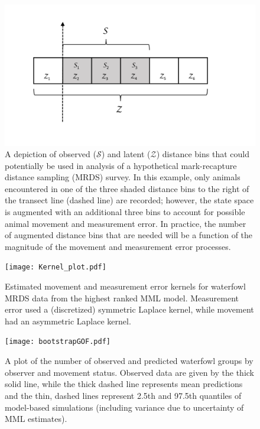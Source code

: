 \documentclass[12pt,fleqn]{article}
\begin{document}
\pagebreak
\begin{figure}
\begin{center}
\includegraphics[width=150mm]{augmented_bin_figure.pdf}
\caption{A depiction of observed ($\mathcal{S}$) and latent ($\mathcal{Z}$) distance bins that could potentially be used in analysis of a hypothetical mark-recapture distance sampling (MRDS) survey.  In this example, only animals encountered in one of the three shaded distance bins to the right of the transect line (dashed line) are recorded; however, the state space is augmented with an additional three bins to account for possible animal movement and measurement error.  In practice, the number of augmented distance bins that are needed will be a function of the magnitude of the movement and measurement error processes.}
\label{fig:aug_bins}
\end{center}
\end{figure}


\pagebreak
\begin{figure}
\begin{center}
\texttt{[image: Kernel\_plot.pdf]}
\caption{Estimated movement and measurement error kernels for waterfowl MRDS data from the highest ranked MML model. Measurement error used a (discretized) symmetric Laplace kernel, while movement had an asymmetric Laplace kernel.}
\label{fig:kernel}
\end{center}
\end{figure}

\pagebreak
\begin{figure}
\begin{center}
\texttt{[image: bootstrapGOF.pdf]}
\caption{A plot of the number of observed and predicted waterfowl groups by observer and movement status.  Observed data are given by the thick solid line, while the thick dashed line represents mean predictions and the thin, dashed lines represent 2.5th and 97.5th quantiles of model-based simulations (including variance due to uncertainty of MML estimates).  }
\label{fig:GOF}
\end{center}
\end{figure}
\end{document}

